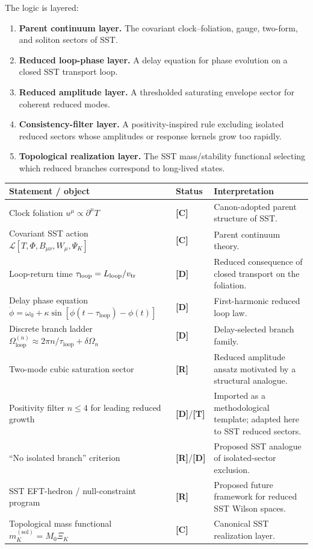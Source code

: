 \documentclass[11pt]{article}
\newcommand{\Lag}{\mathcal{L}}
\newcommand{\Oloop}{\Omega_\textrm{loop}}
\newcommand{\tauloop}{\tau_\textrm{loop}}
\newcommand{\vtr}{v_\textrm{tr}}
\newcommand{\TagT}{\textbf{[T]}} %
\newcommand{\TagD}{\textbf{[D]}} %
\newcommand{\TagC}{\textbf{[C]}} %
\newcommand{\TagR}{\textbf{[R]}} %
\theoremstyle{definition}
\theoremstyle{plain}
\begin{document}
The logic is layered:

\begin{enumerate}[label=\textbf{L\arabic*.}]
\item \textbf{Parent continuum layer.} The covariant clock--foliation, gauge, two-form, and soliton sectors of SST.
\item \textbf{Reduced loop-phase layer.} A delay equation for phase evolution on a closed SST transport loop.
\item \textbf{Reduced amplitude layer.} A thresholded saturating envelope sector for coherent reduced modes.
\item \textbf{Consistency-filter layer.} A positivity-inspired rule excluding isolated reduced sectors whose amplitudes or response kernels grow too rapidly.
\item \textbf{Topological realization layer.} The SST mass/stability functional selecting which reduced branches correspond to long-lived states.
\end{enumerate}

\begin{center}
\begin{longtable}{>{\raggedright\arraybackslash}p{} >{\raggedright\arraybackslash}p{} >{\raggedright\arraybackslash}p{}}
\toprule
\textbf{Statement / object} & \textbf{Status} & \textbf{Interpretation} \\
\midrule
Clock foliation \(u^\mu \propto \partial^\mu T\) & \TagC & Canon-adopted parent structure of SST. \\
Covariant SST action \(\Lag[T,\Phi,B_{\mu\nu},W_\mu,\Psi_K]\) & \TagC & Parent continuum theory. \\
Loop-return time \(\tauloop=L_{\rm loop}/\vtr\) & \TagD & Reduced consequence of closed transport on the foliation. \\
Delay phase equation \(\dot\phi=\omega_0+\kappa\sin[\phi(t-\tauloop)-\phi(t)]\) & \TagD & First-harmonic reduced loop law. \\
Discrete branch ladder \(\Oloop^{(n)}\approx 2\pi n/\tauloop+\delta\Omega_n\) & \TagD & Delay-selected branch family. \\
Two-mode cubic saturation sector & \TagR & Reduced amplitude ansatz motivated by a structural analogue. \\
Positivity filter \(n\le 4\) for leading reduced growth & \TagD/\TagT & Imported as a methodological template; adapted here to SST reduced sectors. \\
``No isolated branch'' criterion & \TagR/\TagD & Proposed SST analogue of isolated-sector exclusion. \\
SST EFT-hedron / null-constraint program & \TagR & Proposed future framework for reduced SST Wilson spaces. \\
Topological mass functional \(m_K^{(\mathrm{sol})}=M_0\Xi_K\) & \TagC & Canonical SST realization layer. \\
\bottomrule
\end{longtable}
\end{center}
\end{document}
